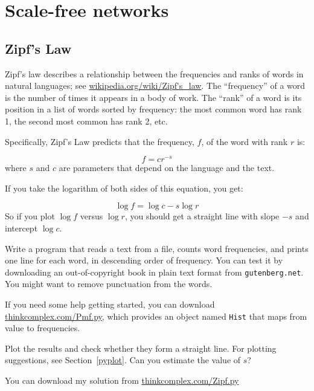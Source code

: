 \documentclass[10pt]{book}
\begin{document}
\chapter{Scale-free networks}

\section{Zipf's Law}

Zipf's law describes a relationship between the frequencies and ranks
of words in natural languages; see
  \url{wikipedia.org/wiki/Zipf's_law}.  The ``frequency'' of
a word is the number of times it appears in a body of work.
The ``rank'' of a word is its position in a list of words
sorted by frequency: the most common word has rank 1, the
second most common has rank 2, etc.

Specifically, Zipf's Law
predicts that the frequency, $f$, of the word with rank $r$ is:

\[ f = c r^{-s} \]
%
where $s$ and $c$ are parameters that depend on the language and the
text.

If you take the logarithm of both sides of this equation, you get:


\[ \log f = \log c - s \log r \]
%
So if you plot $\log f$ versus $\log r$, you should get
a straight line with slope $-s$ and intercept $\log c$.

\begin{exercise}

Write a program that reads a text from a file, counts word
frequencies, and prints one line for each word, in descending order of
frequency.  You can test it by downloading an out-of-copyright book in
plain text format from {\tt gutenberg.net}.  You might want to remove
punctuation from the words.

If you need some help getting started, you can download
\url{thinkcomplex.com/Pmf.py}, which provides an
object named {\tt Hist} that maps from value to frequencies.

Plot the results and check whether they form
a straight line.  For plotting suggestions, see Section~\ref{pyplot}.
Can you estimate the value of $s$?

You can download my solution from
\url{thinkcomplex.com/Zipf.py}

\end{exercise}
\end{document}
